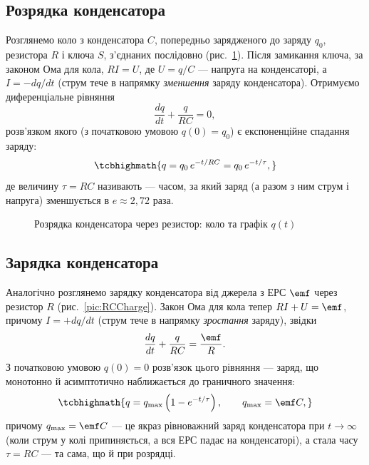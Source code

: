 \subsection*{Розрядка конденсатора}

Розглянемо коло з конденсатора $C$, попередньо зарядженого до заряду $q_0$, резистора $R$ і ключа $S$, з'єднаних послідовно
(рис.~\ref{pic:RCDischarge}). Після замикання ключа, за законом Ома для кола, $RI = U$, де $U = q/C$ --- напруга на конденсаторі, а
$I = -dq/dt$ (струм тече в напрямку \emph{зменшення} заряду конденсатора). Отримуємо диференціальне рівняння
\begin{equation}\label{eq:RCDischarge}
	\frac{dq}{dt} + \frac{q}{RC} = 0,
\end{equation}
розв'язком якого (з початковою умовою $q(0)=q_0$) є експоненційне спадання заряду:
\begin{equation}\label{eq:RCDischargeSolution}
	\tcbhighmath{
		q = q_0\, e^{-t/RC} = q_0\, e^{-t/\tau},
	}
\end{equation}
де величину $\tau = RC$ називають  --- часом, за який заряд (а разом з ним струм і напруга) зменшується в $e\approx 2{,}72$
раза.

\begin{figure}[h!]\centering
	\caption{Розрядка конденсатора через резистор: коло та графік $q(t)$\label{pic:RCDischarge}}
\end{figure}

\subsection*{Зарядка конденсатора}

Аналогічно розглянемо зарядку конденсатора від джерела з ЕРС $\emf$ через резистор $R$ (рис.~\ref{pic:RCCharge}). Закон Ома для кола тепер
$RI + U = \emf$, причому $I = +dq/dt$ (струм тече в напрямку \emph{зростання} заряду), звідки
\begin{equation}\label{eq:RCCharge}
	\frac{dq}{dt} + \frac{q}{RC} = \frac{\emf}{R}.
\end{equation}
З початковою умовою $q(0) = 0$ розв'язок цього рівняння --- заряд, що монотонно й асимптотично наближається до граничного значення:
\begin{equation}\label{eq:RCChargeSolution}
	\tcbhighmath{
		q = q_{\max}\left(1 - e^{-t/\tau}\right), \qquad q_{\max} = \emf C,
	}
\end{equation}
причому $q_{\max} = \emf C$ --- це якраз рівноважний заряд конденсатора при $t\to\infty$ (коли струм у колі припиняється, а вся ЕРС падає на
конденсаторі), а стала часу $\tau = RC$ --- та сама, що й при розрядці.

